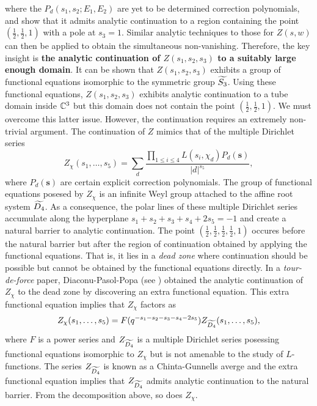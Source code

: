 \documentclass[12pt,reqno,oneside]{amsart}
\begin{document}
where the $P_{d}(s_{1},s_{2};E_{1},E_{2})$ are yet to be determined correction polynomials, and show that it admits analytic continuation to a region containing the point $\left(\frac{1}{2},\frac{1}{2},1\right)$ with a pole at $s_{3} = 1$. Similar analytic techniques to those for $Z(s,w)$ can then be applied to obtain the simultaneous non-vanishing. Therefore, the key insight is \textbf{the analytic continuation of $Z(s_{1},s_{2},s_{3})$ to a suitably large enough domain}. It can be shown that $Z(s_{1},s_{2},s_{3})$ exhibits a group of functional equations isomorphic to the symmetric group $\widetilde{S_{3}}$. Using these functional equations, $Z(s_{1},s_{2},s_{3})$ exhibits analytic continuation to a tube domain inside $\mathbb{C}^{3}$ but this domain does not contain the point $\left(\frac{1}{2},\frac{1}{2},1\right)$. We must overcome this latter issue. However, the continuation requires an extremely non-trivial argument. The continuation of $Z$ mimics that of the multiple Dirichlet series
\[
  Z_{\chi}(s_{1},\ldots,s_{5}) = \sum_{d}\frac{\prod_{1 \le i \le 4}L(s_{i},\chi_{d})P_{d}(\mathbf{s})}{|d|^{s_{5}}},
\]
where $P_{d}(\mathbf{s})$ are certain explicit correction polynomials. The group of functional equations posesed by $Z_{\chi}$ is an infinite Weyl group attached to the affine root system $\widetilde{D_{4}}$. As a consequence, the polar lines of these multiple Dirichlet series accumulate along the hyperplane $s_{1}+s_{2}+s_{3}+s_{4}+2s_{5} = -1$ and create a natural barrier to analytic continuation. The point $\left(\frac{1}{2},\frac{1}{2},\frac{1}{2},\frac{1}{2},1\right)$ occures before the natural barrier but after the region of continuation obtained by applying the functional equations. That is, it lies in a \textit{dead zone} where continuation should be possible but cannot be obtained by the functional equations directly. In a \textit{tour-de-force} paper, Diaconu-Pasol-Popa (see \cite{DPP}) obtained the analytic continuation of $Z_{\chi}$ to the dead zone by discovering an extra functional equation. This extra functional equation implies that $Z_{\chi}$ factors as
\begin{equation}\label{equ:factorization}
  Z_{\chi}(s_{1},\ldots,s_{5}) = F(q^{-s_{1}-s_{2}-s_{3}-s_{4}-2s_{5}})Z_{\widetilde{D_{4}}}(s_{1},\ldots,s_{5}),
\end{equation}
where $F$ is a power series and $Z_{\widetilde{D_{4}}}$ is a multiple Dirichlet series posessing functional equations isomorphic to $Z_{\chi}$ but is not amenable to the study of $L$-functions. The series $Z_{\widetilde{D_{4}}}$ is known as a Chinta-Gunnells averge and the extra functional equation implies that $Z_{\widetilde{D_{4}}}$ admits analytic continuation to the natural barrier. From the decomposition above, so does $Z_{\chi}$.
\end{document}

